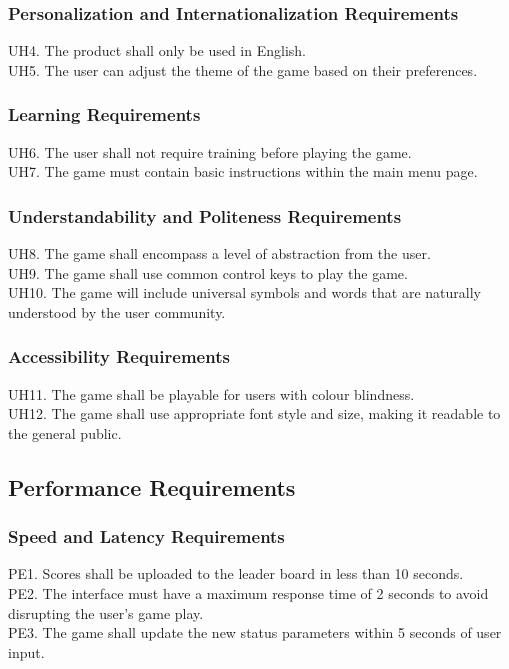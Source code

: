 \documentclass[12pt]{article}
\begin{document}
    \subsubsection{Personalization and Internationalization Requirements}
    UH4. The product shall only be used in English.\\
    UH5. The user can adjust the theme of the game based on their preferences.
    
    \subsubsection{Learning Requirements}
    UH6. The user shall not require training before playing the game.\\
    UH7. The game must contain basic instructions within the main menu page.

    \subsubsection{Understandability and Politeness Requirements}
    UH8. The game shall encompass a level of abstraction from the user.\\
    UH9. The game shall use common control keys to play the game.\\
    UH10. The game will include universal symbols and words that are naturally understood by the user community.
    
    \subsubsection{Accessibility Requirements}
    UH11. The game shall be playable for users with colour blindness.\\
    UH12. The game shall use appropriate font style and size, making it readable to the general public.
    
\subsection{Performance Requirements}
    \subsubsection{Speed and Latency Requirements}
    PE1. Scores shall be uploaded to the leader board in less than 10 seconds.\\
    PE2. The interface must have a maximum response time of 2 seconds to avoid disrupting the user's game play.\\
    PE3. The game shall update the new status parameters within 5 seconds of user input.
\end{document}
